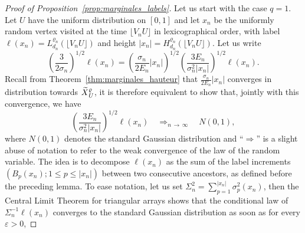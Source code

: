 \documentclass[AHL,Unicode,longabstracts,published]{cedram}
\newcommand{\1}{\ensembles{1}}
\newcommand{\tildep}[1]{\widetilde{#1}\vphantom{#1}}
\renewcommand{\le}{\leqslant}
\newcommand{\Nmap}{N}
\newcommand{\Hfn}{H_{d_n}^{\varrho_n}}
\newcommand{\Lfn}{L_{d_n}^{\varrho_n}}
\newcommand{\tX}{\tildep{X}^{\varrho}}
\newcommand{\edges}{E}
\newcommand{\vertices}{V}
\begin{document}
\begin{proof}[Proof of Proposition~\ref{prop:marginales_labels}]
Let us start with the case $q=1$. Let $U$ have the uniform distribution on $[0,1]$ and let $x_n$ be the uniformly random vertex visited at the time $\lfloor \vertices_n U \rfloor$ in lexicographical order, with label $\ell(x_n) = \Lfn(\lfloor \vertices_n U \rfloor)$ and height $|x_n| = \Hfn(\lfloor \vertices_n U \rfloor)$. Let us write
\[
\left(\frac{3}{2\sigma_n}\right)^{1/2} \ell(x_n) = \left(\frac{\sigma_n}{2 \edges_n} |x_n|\right)^{1/2} \left(\frac{3 \edges_n}{\sigma_n^2 |x_n|}\right)^{1/2} \ell(x_n).
\]
Recall from Theorem~\ref{thm:marginales_hauteur} that $\frac{\sigma_n}{2 \edges_n} |x_n|$ converges in distribution towards $\tX_U$, it is therefore equivalent to show that, jointly with this convergence, we have
\begin{equation}\label{eq:cv_label_unif}
\left(\frac{3 \edges_n}{\sigma_n^2 |x_n|}\right)^{1/2} \ell(x_n) \quad\mathop{\Longrightarrow}_{n\,\to\,\infty}\quad \Nmap(0, 1),
\end{equation}
where $\Nmap(0, 1)$ denotes the standard Gaussian distribution and ``$\Rightarrow$'' is a slight abuse of notation to refer to the weak convergence of the law of the random variable. The idea is to decompose $\ell(x_n)$ as the sum of the label increments $(B_p(x_n) ; 1 \le p \le |x_n|)$ between two consecutive ancestors, as defined before the preceding lemma. To ease notation, let us set $\Sigma_n^2 = \sum_{p=1}^{|x_n|} \sigma^2_p(x_n)$, then the Central Limit Theorem for triangular arrays shows that the conditional law of $\Sigma_n^{-1} \ell(x_n)$ converges to the standard Gaussian distribution as soon as for every $\varepsilon > 0$,


\end{proof}
\end{document}
